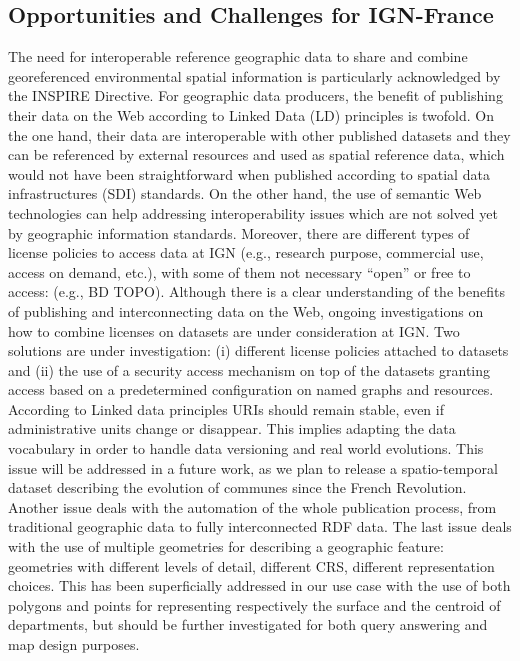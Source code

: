 \subsection{Opportunities and Challenges for IGN-France}
\label{sec:challenges}

 The need for interoperable reference geographic data to share and combine georeferenced environmental spatial information is particularly acknowledged by the INSPIRE Directive. For geographic data producers, the benefit of publishing their data on the Web according to Linked Data  (LD) principles is twofold. On the one hand, their data are interoperable with other published datasets and they can be referenced by external resources and used as spatial reference data, which would not have been straightforward when published according to spatial data infrastructures (SDI) standards. On the other hand, the use of semantic Web technologies can help addressing interoperability issues which are not solved yet by geographic information standards. 
Moreover, there are different types of license policies to access data at IGN (e.g., research purpose, commercial use, access on demand, etc.), with some of them not necessary ``open'' or free to access: (e.g., BD TOPO\circledR). Although there is a clear understanding of the benefits of publishing and interconnecting data on the Web, ongoing investigations on how to combine licenses on datasets are under consideration at IGN. Two solutions are under investigation: (i) different license policies attached to datasets and (ii) the use of a security access mechanism on top of the datasets granting access based on a predetermined configuration on named graphs and resources. 
According to Linked data principles URIs should remain stable, even if administrative units change or disappear. This implies adapting the data vocabulary in order to handle data versioning and real world evolutions. This issue will be addressed in a future work, as we plan to release a spatio-temporal dataset describing the evolution of communes since the French Revolution. Another issue deals with the automation of the whole publication process, from traditional geographic data to fully interconnected RDF data.
The last issue deals with the use of multiple geometries for describing a geographic feature: geometries with different levels of detail, different CRS, different representation choices. This has been superficially addressed in our use case with the use of both polygons and points for representing respectively the surface and the centroid of departments, but should be further investigated for both query answering and map design purposes.


